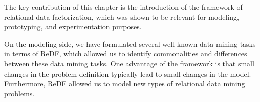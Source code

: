 The key contribution of this chapter is the introduction of the framework of relational data factorization,  
which was shown to be relevant for modeling, prototyping, and experimentation purposes. 

On the modeling side, we have formulated several well-known data mining tasks in terms of ReDF, 
which allowed us to identify commonalities and differences between these data mining tasks. 
One advantage of the framework is that small changes in the problem definition typically lead to small changes in the model. Furthermore, ReDF allowed us to model new types of relational data mining problems.

 





